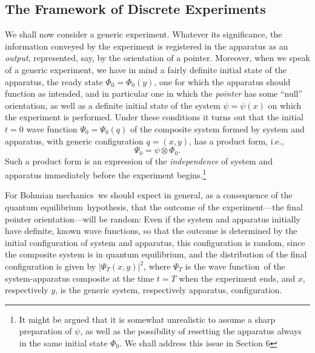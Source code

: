 \documentclass[12pt]{article}
\newcommand{\BM}{Bohmian mechanics}
\newcommand{\wf}{wave function}
\newcommand{\qe}{quantum equilibrium}
\newcommand{\ot}{\otimes}
\begin{document}
\subsection{The Framework of Discrete Experiments}
\label{sec:FDE}
We shall now consider a generic experiment.  Whatever its
significance, the information conveyed by the experiment is registered
in the apparatus as an \emph{output}, represented, say, by the
orientation of a pointer.  Moreover, when we speak of a generic
experiment, we have in mind a fairly definite initial state of the
apparatus, the ready state $\Phi_0=\Phi_{0}(y)$, one for which the
apparatus should function as intended, and in particular one in which
the \emph{pointer} has some ``null'' orientation, as well as a
definite initial state of the system $\psi=\psi(x)$ on which the
experiment is performed.  Under these conditions it turns out
\cite{DGZ92a} that the initial $t=0$ \wf{} $\Psi_0=\Psi_{0}(q)$ of the
composite system formed by system and apparatus, with generic
configuration $q=(x,y)$, has a product form, i.e.,
$$
\Psi_0 = \psi \ot \Phi_0 .$$
Such a product form is an expression
of the \emph{independence} of system and apparatus immediately before
the experiment begins.\footnote{It might be argued that it is somewhat
   unrealistic to assume a sharp preparation of $\psi$, as well as the
   possibility of resetting the apparatus always in the same initial
   state $\Phi_0$.  We shall address this issue in Section 6}

For \BM\ we should expect in general, as a consequence of the \qe\
hypothesis, that the outcome of the experiment---the final pointer
orientation---will be random: Even if the system and apparatus
initially have definite, known \wf s, so that the outcome is
determined by the initial configuration of system and apparatus, this
configuration is random, since the composite system is in \qe, and the
distribution of the final configuration is given by
$|\Psi_{T}(x,y)|^2$, where $\Psi_{T}$ is the \wf\ of the
system-apparatus composite at the time $t=T$ when the experiment ends,
and $x$, respectively $y$, is the generic system, respectively
apparatus, configuration.
\end{document}
